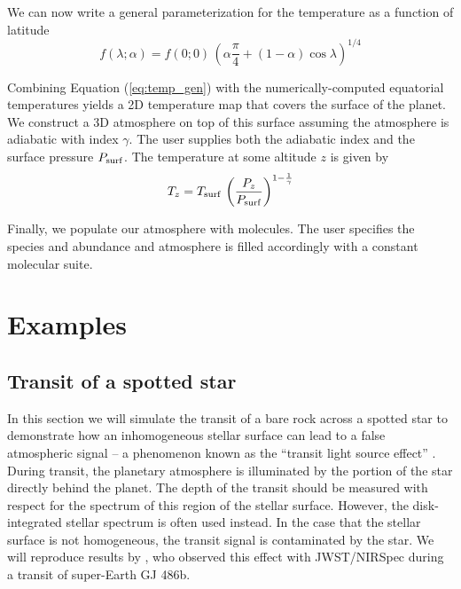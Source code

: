 \documentclass[twocolumn]{aastex631}
\begin{document}
We can now write a general parameterization for the temperature as a function of latitude
\begin{equation}
    \label{eq:temp_gen}
    f(\lambda;\alpha) = f(0;0)\,\left(\alpha \frac{\pi}{4} + (1-\alpha) \cos{\lambda}\right)^{1/4}
\end{equation}

Combining Equation (\ref{eq:temp_gen}) with the numerically-computed equatorial temperatures yields a 2D temperature map that covers the surface of the planet. We construct a 3D atmosphere on top of this surface assuming the atmosphere is adiabatic with index $\gamma$. The user supplies both the adiabatic index and the surface pressure $P_{\rm surf}$. The temperature at some altitude $z$ is given by
\begin{equation}
    T_z = T_{\rm surf}\,\left( \frac{P_z}{P_{\rm surf}} \right)^{1-\frac{1}{\gamma}}
\end{equation}

Finally, we populate our atmosphere with molecules. The user specifies the species and abundance and atmosphere is filled accordingly with a constant molecular suite.

\section{Examples \label{sec:examples}}

\subsection{Transit of a spotted star}

In this section we will simulate the transit of a bare rock across a spotted star to demonstrate how an inhomogeneous
stellar surface can lead to a false atmospheric signal -- a phenomenon known as the ``transit light source effect'' \citep{rackham2018}.
During transit, the planetary atmosphere is illuminated by the portion of the star directly behind the planet. The depth of the transit
should be measured with respect for the spectrum of this region of the stellar surface. However, the disk-integrated stellar spectrum is often used instead.
In the case that the stellar surface is not homogeneous, the transit signal is contaminated by the star.
We will reproduce results by \citet{moran2023}, who observed this effect with JWST/NIRSpec during a transit of super-Earth GJ 486b.
\end{document}
